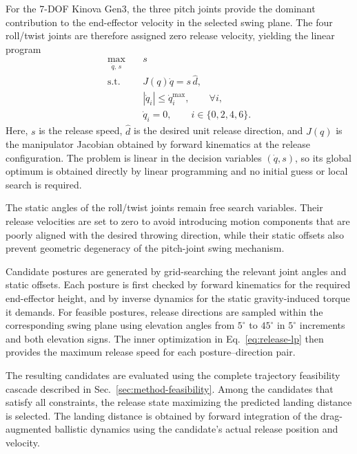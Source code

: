 \documentclass[letterpaper, 10 pt, conference]{ieeeconf}
\begin{document}
For the 7-DOF Kinova Gen3, the three pitch joints provide the dominant
contribution to the end-effector velocity in the selected swing plane. The four
roll/twist joints are therefore assigned zero release velocity, yielding the
linear program
\begin{equation}
\begin{aligned}
\max_{\dot q,\,s}\quad &s\\
\text{s.t.}\quad
&J(q)\dot q=s\,\hat d,\\
&|\dot q_i|\leq\dot q_i^{\max},\qquad \forall i,\\
&\dot q_i=0,\qquad i\in\{0,2,4,6\}.
\end{aligned}
\label{eq:release-lp}
\end{equation}
Here, $s$ is the release speed, $\hat d$ is the desired unit release direction,
and $J(q)$ is the manipulator Jacobian obtained by forward kinematics at the
release configuration. The problem is linear in the decision variables
$(\dot q,s)$, so its global optimum is obtained directly by linear programming
and no initial guess or local search is required.

The static angles of the roll/twist joints remain free search variables. Their
release velocities are set to zero to avoid introducing motion components that
are poorly aligned with the desired throwing direction, while their static
offsets also prevent geometric degeneracy of the pitch-joint swing mechanism.

Candidate postures are generated by grid-searching the relevant joint angles
and static offsets. Each posture is first checked by forward kinematics for the
required end-effector height, and by inverse dynamics for the static
gravity-induced torque it demands. For feasible postures,
release directions are sampled within the corresponding swing plane using
elevation angles from $5^\circ$ to $45^\circ$ in $5^\circ$ increments and both
elevation signs. The inner optimization in Eq.~\eqref{eq:release-lp} then
provides the maximum release speed for each posture--direction pair.

The resulting candidates are evaluated using the complete trajectory
feasibility cascade described in Sec.~\ref{sec:method-feasibility}. Among the
candidates that satisfy all constraints, the release state maximizing the
predicted landing distance is selected. The landing distance is obtained by
forward integration of the drag-augmented ballistic dynamics using the
candidate's actual release position and velocity.
\end{document}
